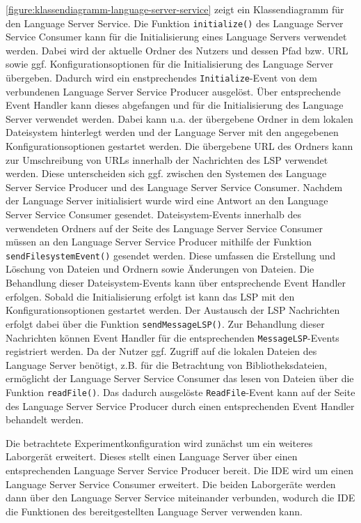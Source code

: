 \autoref{figure:klassendiagramm-language-server-service} zeigt ein Klassendiagramm für den Language Server Service. Die Funktion \texttt{initialize()} des Language Server Service Consumer kann für die Initialisierung eines Language Servers verwendet werden. Dabei wird der aktuelle Ordner des Nutzers und dessen Pfad bzw. URL sowie ggf. Konfigurationsoptionen für die Initialisierung des Language Server übergeben. Dadurch wird ein enstprechendes \texttt{Initialize}-Event von dem verbundenen Language Server Service Producer ausgelöst. Über entsprechende Event Handler kann dieses abgefangen und für die Initialisierung des Language Server verwendet werden. Dabei kann u.a. der übergebene Ordner in dem lokalen Dateisystem hinterlegt werden und der Language Server mit den angegebenen Konfigurationsoptionen gestartet werden. Die übergebene URL des Ordners kann zur Umschreibung von URLs innerhalb der Nachrichten des \ac{LSP} verwendet werden. Diese unterscheiden sich ggf. zwischen den Systemen des Language Server Service Producer und des Language Server Service Consumer. Nachdem der Language Server initialisiert wurde wird eine Antwort an den Language Server Service Consumer gesendet. Dateisystem-Events innerhalb des verwendeten Ordners auf der Seite des Language Server Service Consumer müssen an den Language Server Service Producer mithilfe der Funktion \texttt{sendFilesystemEvent()} gesendet werden. Diese umfassen die Erstellung und Löschung von Dateien und Ordnern sowie Änderungen von Dateien. Die Behandlung dieser Dateisystem-Events kann über entsprechende Event Handler erfolgen. Sobald die Initialisierung erfolgt ist kann das \ac{LSP} mit den Konfigurationsoptionen gestartet werden. Der Austausch der \ac{LSP} Nachrichten erfolgt dabei über die Funktion \texttt{sendMessageLSP()}. Zur Behandlung dieser Nachrichten können Event Handler für die entsprechenden \texttt{MessageLSP}-Events registriert werden. Da der Nutzer ggf. Zugriff auf die lokalen Dateien des Language Server benötigt, z.B. für die Betrachtung von Bibliotheksdateien, ermöglicht der Language Server Service Consumer das lesen von Dateien über die Funktion \texttt{readFile()}. Das dadurch ausgelöste \texttt{ReadFile}-Event kann auf der Seite des Language Server Service Producer durch einen entsprechenden Event Handler behandelt werden.

Die betrachtete Experimentkonfiguration wird zunächst um ein weiteres Laborgerät erweitert. Dieses stellt einen Language Server über einen entsprechenden Language Server Service Producer bereit. Die IDE wird um einen Language Server Service Consumer erweitert. Die beiden Laborgeräte werden dann über den Language Server Service miteinander verbunden, wodurch die IDE die Funktionen des bereitgestellten Language Server verwenden kann.